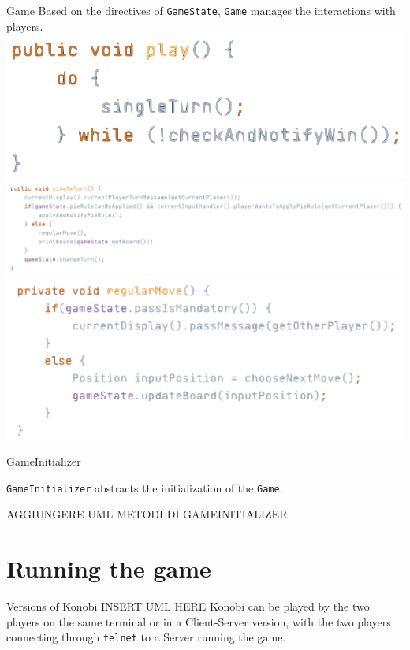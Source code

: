 \documentclass{beamer}
\begin{document}
\begin{frame}{Game}	 
	Based on the directives of \texttt{GameState}, \texttt{Game} manages the interactions with players.
	\\
	\vspace{0.5cm}
     	\pause
	\includegraphics[scale=0.26]{images/play.png}
   	\pause
	\includegraphics[scale=0.26]{images/singleturn.png}
	\pause
	\includegraphics[scale=0.26]{images/regularmove.png}
\end{frame}

\begin{frame}{GameInitializer}

	\texttt{GameInitializer} abstracts the initialization of the \texttt{Game}.
	
	AGGIUNGERE UML METODI DI GAMEINITIALIZER

\end{frame}


\section{Running the game}

\begin{frame}{Versions of Konobi}
INSERT UML HERE
Konobi can be played by the two players on the same terminal or in a Client-Server version, with the two players connecting through \texttt{telnet} to a Server running the game.
\end{frame}
\end{document}
